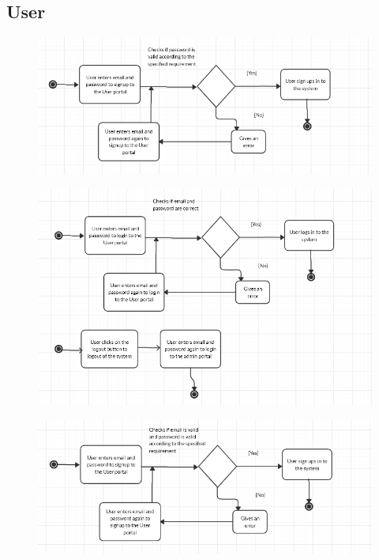 \subsection{User}
\begin{figure}[!hb]
   \centering

   \includegraphics[scale=0.4]{images/User.PNG}
\end{figure}
\begin{figure}[!hb]
   \centering

   \includegraphics[scale=0.4]{images/User_1.PNG}
\end{figure}
\begin{figure}[!hb]
   \centering

   \includegraphics[scale=0.4]{images/User_2.PNG}
\end{figure}
